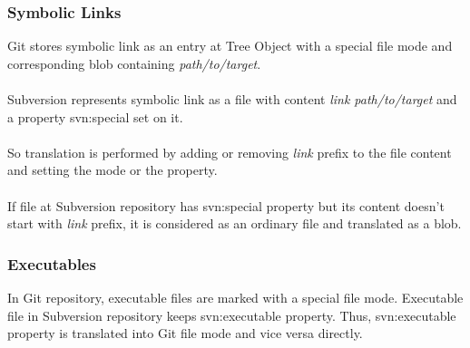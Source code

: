 \begin{center}
\begin{tabular}{ | p{} | p{} | p{} | p{} |}
\end{tabular}
\label{eol_mime_git_to_svn}
\end{center}

\subsubsection{Symbolic Links}
Git stores symbolic link as an entry at Tree Object with a special file mode and corresponding blob containing \emph{path/to/target}.
\\\\
Subversion represents symbolic link as a file with content \emph{link path/to/target} and a property svn:special set on it.
\\\\
So translation is performed by adding or removing \emph{link } prefix to the file content and setting the mode or the property.
\\\\
If file at Subversion repository has svn:special property but its content doesn't start with \emph{link } prefix, it is considered as an ordinary file and translated as a blob.

\subsubsection{Executables}
In Git repository, executable files are marked with a special file mode. Executable file in Subversion repository keeps svn:executable property. 
Thus, svn:executable property is translated into Git file mode and vice versa directly.

